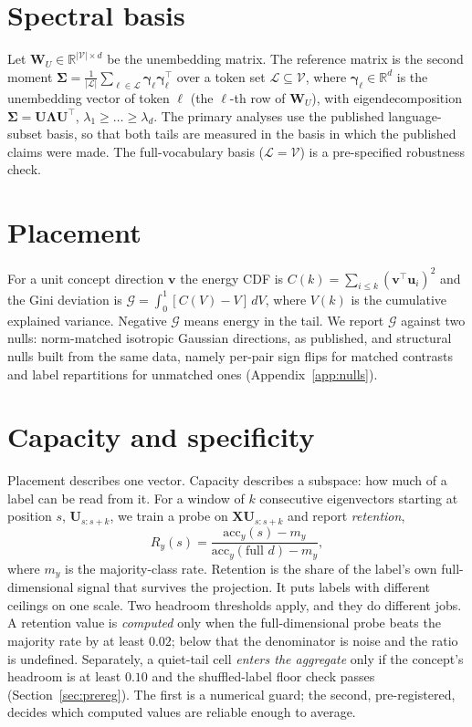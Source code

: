 \documentclass[11pt]{report}
\begin{document}
\section{Spectral basis}
Let $\mathbf{W}_U \in \mathbb{R}^{|\mathcal{V}|\times d}$ be the unembedding
matrix. The reference matrix is the second moment
$\boldsymbol{\Sigma} = \tfrac{1}{|\mathcal{L}|}\sum_{\ell\in\mathcal{L}}
\boldsymbol{\gamma}_\ell\boldsymbol{\gamma}_\ell^\top$ over a token set
$\mathcal{L}\subseteq\mathcal{V}$, where $\boldsymbol{\gamma}_\ell\in\mathbb{R}^d$
is the unembedding vector of token $\ell$ (the $\ell$-th row of
$\mathbf{W}_U$), with eigendecomposition
$\boldsymbol{\Sigma} = \mathbf{U}\boldsymbol{\Lambda}\mathbf{U}^\top$,
$\lambda_1 \ge \dots \ge \lambda_d$. The primary analyses use the published
language-subset basis, so that both tails are measured in the basis in which the
published claims were made. The full-vocabulary basis
($\mathcal{L}=\mathcal{V}$) is a pre-specified robustness check.

\section{Placement}
For a unit concept direction $\mathbf{v}$ the energy CDF is
$C(k) = \sum_{i\le k}(\mathbf{v}^\top\mathbf{u}_i)^2$ and the Gini deviation is
$\mathcal{G} = \int_0^1 [C(V) - V]\,dV$, where $V(k)$ is the cumulative explained
variance. Negative $\mathcal{G}$ means energy in the tail. We report
$\mathcal{G}$ against two nulls: norm-matched isotropic Gaussian directions, as
published, and structural nulls built from the same data, namely per-pair sign
flips for matched contrasts and label repartitions for unmatched ones
(Appendix~\ref{app:nulls}).

\section{Capacity and specificity}
Placement describes one vector. Capacity describes a subspace: how much of a
label can be read from it. For a window of $k$ consecutive eigenvectors starting
at position $s$, $\mathbf{U}_{s:s+k}$, we train a probe on
$\mathbf{X}\mathbf{U}_{s:s+k}$ and report \emph{retention},
\begin{equation}
  R_y(s) = \frac{\mathrm{acc}_y(s) - m_y}{\mathrm{acc}_y(\text{full } d) - m_y},
\end{equation}
where $m_y$ is the majority-class rate. Retention is the share of the label's
own full-dimensional signal that survives the projection. It puts labels with
different ceilings on one scale. Two headroom thresholds apply, and they do
different jobs. A retention value is \emph{computed} only when the
full-dimensional probe beats the majority rate by at least $0.02$; below that the
denominator is noise and the ratio is undefined. Separately, a quiet-tail cell
\emph{enters the aggregate} only if the concept's headroom is at least $0.10$ and
the shuffled-label floor check passes (Section~\ref{sec:prereg}). The first is a
numerical guard; the second, pre-registered, decides which computed values are
reliable enough to average.
\end{document}
